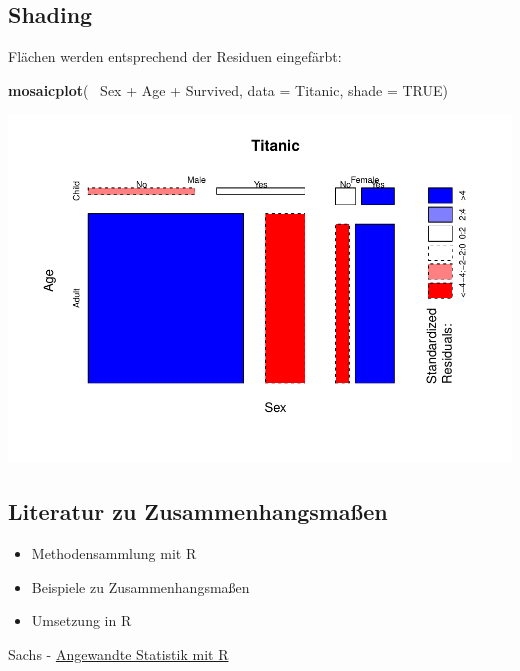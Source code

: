 \documentclass[]{article}
\newenvironment{Shaded}{\begin{snugshade}}{\end{snugshade}}
\newcommand{\KeywordTok}[1]{\textcolor[rgb]{0.13,0.29,0.53}{\textbf{{#1}}}}
\newcommand{\DataTypeTok}[1]{\textcolor[rgb]{0.13,0.29,0.53}{{#1}}}
\newcommand{\StringTok}[1]{\textcolor[rgb]{0.31,0.60,0.02}{{#1}}}
\newcommand{\OtherTok}[1]{\textcolor[rgb]{0.56,0.35,0.01}{{#1}}}
\newcommand{\NormalTok}[1]{{#1}}
\providecommand{\tightlist}{%
  \setlength{\itemsep}{0pt}\setlength{\parskip}{0pt}}
\begin{document}
\subsection{Shading}\label{shading}

Flächen werden entsprechend der Residuen eingefärbt:

\begin{Shaded}
\begin{Highlighting}[]
\KeywordTok{mosaicplot}\NormalTok{(~}\StringTok{ }\NormalTok{Sex +}\StringTok{ }\NormalTok{Age +}\StringTok{ }\NormalTok{Survived, }
           \DataTypeTok{data =} \NormalTok{Titanic, }\DataTypeTok{shade =} \OtherTok{TRUE}\NormalTok{)}
\end{Highlighting}
\end{Shaded}

\includegraphics{Intro_Datenanalyse1_files/figure-latex/unnamed-chunk-169-1.pdf}

\subsection{Literatur zu
Zusammenhangsmaßen}\label{literatur-zu-zusammenhangsmaen}

\begin{itemize}
\tightlist
\item
  Methodensammlung mit R
\item
  Beispiele zu Zusammenhangsmaßen
\item
  Umsetzung in R
\end{itemize}

Sachs -
\href{https://books.google.de/books/about/Angewandte_Statistik.html?id=S-zXmAEACAAJ\&redir_esc=y}{Angewandte
Statistik mit R}
\end{document}
